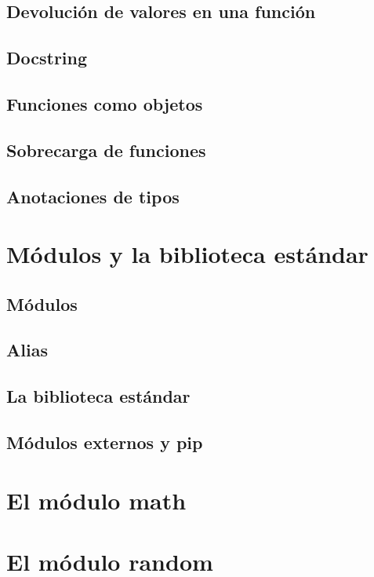 \documentclass{article}
\begin{document}
\subsection{Devolución de valores en una función}

\subsection{Docstring}

\subsection{Funciones como objetos}

\subsection{Sobrecarga de funciones}

\subsection{Anotaciones de tipos}

\section{Módulos y la biblioteca estándar}

\subsection{Módulos}

\subsection{Alias}

\subsection{La biblioteca estándar}

\subsection{Módulos externos y pip}

\section{El módulo math}

\section{El módulo random}
\end{document}
